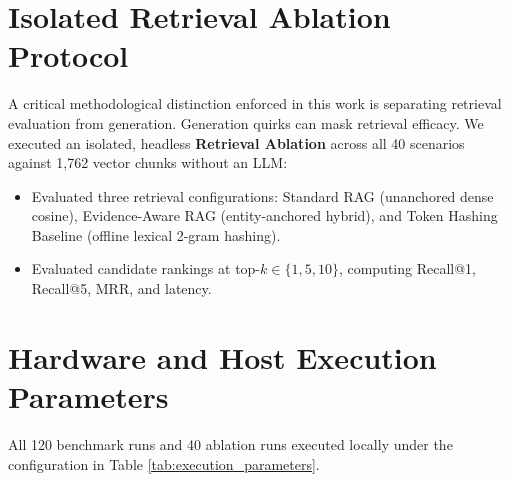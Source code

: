 \section{Isolated Retrieval Ablation Protocol}
\label{sec:ablation_protocol}
A critical methodological distinction enforced in this work is separating retrieval evaluation from generation. Generation quirks can mask retrieval efficacy. We executed an isolated, headless \textbf{Retrieval Ablation} across all 40 scenarios against 1,762 vector chunks without an LLM:
\begin{itemize}
    \item Evaluated three retrieval configurations: Standard RAG (unanchored dense cosine), Evidence-Aware RAG (entity-anchored hybrid), and Token Hashing Baseline (offline lexical 2-gram hashing).
    \item Evaluated candidate rankings at top-$k \in \{1, 5, 10\}$, computing Recall@1, Recall@5, MRR, and latency.
\end{itemize}

\section{Hardware and Host Execution Parameters}
\label{sec:host_parameters}
All 120 benchmark runs and 40 ablation runs executed locally under the configuration in Table \ref{tab:execution_parameters}.

